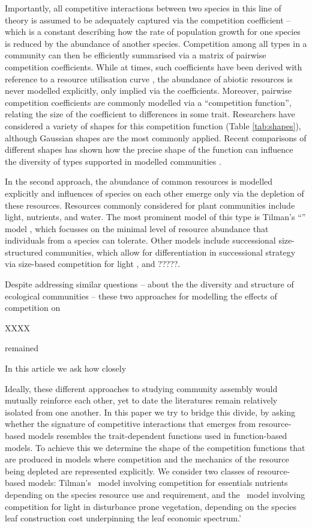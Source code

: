 \documentclass[a4paper,11pt]{article}
\begin{document}
Importantly, all competitive interactions between two species in this line of theory is assumed to be adequately captured via the competition coefficient -- which is a constant describing how the rate of population growth for one species is reduced by the abundance of another species. Competition among all types in a community can then be efficiently summarised via a matrix of pairwise competition coefficients. While at times, such coefficients have been derived with reference to a resource utilisation curve \citep{MacArthur-1967, Roughgarden-1979}, the abundance of abiotic resources is never modelled explicitly, only implied via the coefficients. Moreover, pairwise competition coefficients are commonly modelled via a ``competition function'', relating the size of the coefficient to differences in some trait. Researchers have considered a variety of shapes for this competition function (Table \ref{tab:shapes}), although Gaussian shapes are the most commonly applied. Recent comparisons of different shapes has shown how the precise shape of the function can influence the diversity of types supported in modelled communities \citep{Calcagno-2006, Scheffer-2006, Pigolotti-2007, Leimar-2013, Barabas-2013}. 

In the second approach, the abundance of common resources is modelled explicitly and influences of species on each other emerge only via the depletion of these resources. 
Resources commonly considered for plant communities include light, nutrients, and water. 
The most prominent model of this type is Tilman's ``\Rstar'' model \citep{Tilman-1977, Tilman-1982}, which focusses on the minimal level of resource abundance that individuals from a species can tolerate. Other models include successional size-structured communities, which allow for differentiation in successional strategy via size-based competition for light \citep{Huston-1987,Kohyama-1993,Moorcroft-2001,Falster-2011}, and ?????. 

Despite addressing similar questions -- about the the diversity and structure of ecological communities -- these two approaches for modelling the effects of competition on

XXXX

 remained 


In this article we ask how closely

Ideally, these different approaches to studying community assembly would mutually reinforce each other, yet to date the literatures remain relatively isolated from one another.
%
In this paper we try to bridge this divide, by asking whether the signature of competitive interactions that emerges from resource-based models resembles the trait-dependent functions used in function-based models.
%
To achieve this we determine the shape of the competition functions that are produced in models where competition and the mechanics of the resource being depleted are represented explicitly.
We consider two classes of resource-based models: Tilman's \Rstar\ model involving competition for essentials nutrients depending on the species resource use and requirement, and the \plant\ model involving competition for light in disturbance prone
vegetation, depending on the species leaf construction cost underpinning the leaf economic spectrum.'
\end{document}
